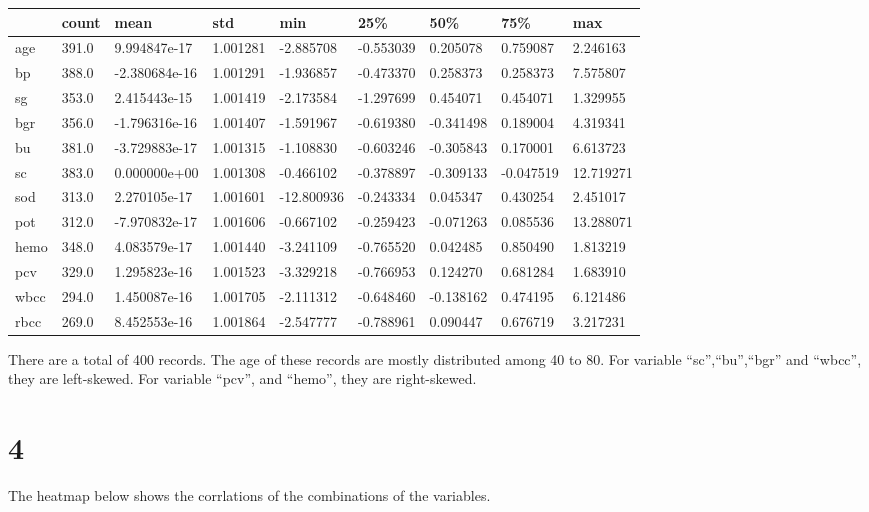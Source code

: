 \documentclass[
  11pt,
  letterpaper,
  DIV=11,
  numbers=noendperiod]{scrartcl}
\begin{document}
\begin{longtable}[]{@{}lllllllll@{}}
\toprule\noalign{}
& count & mean & std & min & 25\% & 50\% & 75\% & max \\
\midrule\noalign{}
\endhead
\bottomrule\noalign{}
\endlastfoot
age & 391.0 & 9.994847e-17 & 1.001281 & -2.885708 & -0.553039 & 0.205078
& 0.759087 & 2.246163 \\
bp & 388.0 & -2.380684e-16 & 1.001291 & -1.936857 & -0.473370 & 0.258373
& 0.258373 & 7.575807 \\
sg & 353.0 & 2.415443e-15 & 1.001419 & -2.173584 & -1.297699 & 0.454071
& 0.454071 & 1.329955 \\
bgr & 356.0 & -1.796316e-16 & 1.001407 & -1.591967 & -0.619380 &
-0.341498 & 0.189004 & 4.319341 \\
bu & 381.0 & -3.729883e-17 & 1.001315 & -1.108830 & -0.603246 &
-0.305843 & 0.170001 & 6.613723 \\
sc & 383.0 & 0.000000e+00 & 1.001308 & -0.466102 & -0.378897 & -0.309133
& -0.047519 & 12.719271 \\
sod & 313.0 & 2.270105e-17 & 1.001601 & -12.800936 & -0.243334 &
0.045347 & 0.430254 & 2.451017 \\
pot & 312.0 & -7.970832e-17 & 1.001606 & -0.667102 & -0.259423 &
-0.071263 & 0.085536 & 13.288071 \\
hemo & 348.0 & 4.083579e-17 & 1.001440 & -3.241109 & -0.765520 &
0.042485 & 0.850490 & 1.813219 \\
pcv & 329.0 & 1.295823e-16 & 1.001523 & -3.329218 & -0.766953 & 0.124270
& 0.681284 & 1.683910 \\
wbcc & 294.0 & 1.450087e-16 & 1.001705 & -2.111312 & -0.648460 &
-0.138162 & 0.474195 & 6.121486 \\
rbcc & 269.0 & 8.452553e-16 & 1.001864 & -2.547777 & -0.788961 &
0.090447 & 0.676719 & 3.217231 \\
\end{longtable}

There are a total of 400 records. The age of these records are mostly
distributed among 40 to 80. For variable ``sc'',``bu'',``bgr'' and
``wbcc'', they are left-skewed. For variable ``pcv'', and ``hemo'', they
are right-skewed.

\section{4}\label{section-2}

The heatmap below shows the corrlations of the combinations of the
variables.
\end{document}
